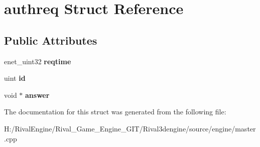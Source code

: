 \hypertarget{structauthreq}{}\section{authreq Struct Reference}
\label{structauthreq}
\subsection*{Public Attributes}
\begin{DoxyCompactItemize}
\item 
\mbox{\label{structauthreq_a9468d4074cc6b250fa8504534a61e313}} 
enet\+\_\+uint32 {\bfseries reqtime}
\item 
\mbox{\label{structauthreq_a440eedf832045662212859af6e07842b}} 
uint {\bfseries id}
\item 
\mbox{\label{structauthreq_a644724f2d2b2adaf08e0356cf9b40ed5}} 
void $\ast$ {\bfseries answer}
\end{DoxyCompactItemize}


The documentation for this struct was generated from the following file\+:\begin{DoxyCompactItemize}
\item 
H\+:/\+Rival\+Engine/\+Rival\+\_\+\+Game\+\_\+\+Engine\+\_\+\+G\+I\+T/\+Rival3dengine/source/engine/master.\+cpp\end{DoxyCompactItemize}
